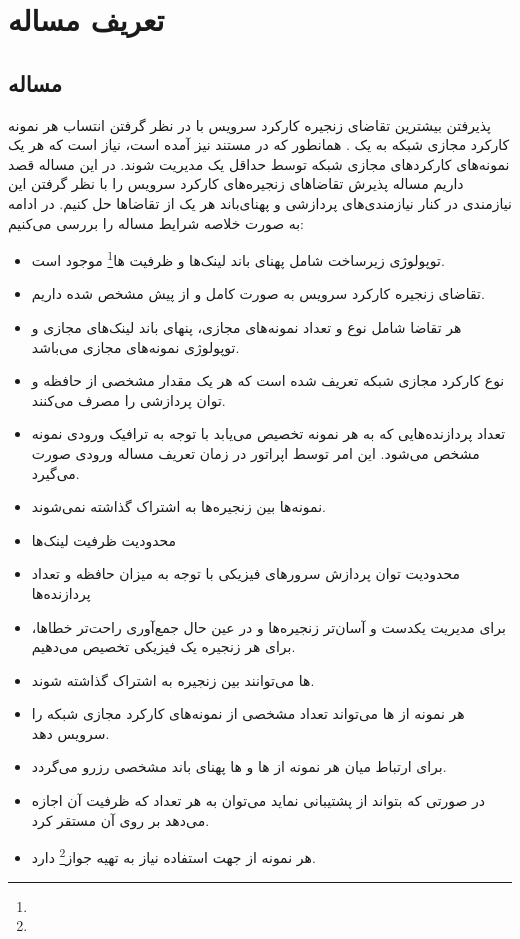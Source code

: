 \chapter{تعریف مساله}

\section{مساله}
پذیرفتن بیشترین تقاضای زنجیره‌ کارکرد سرویس با در نظر گرفتن انتساب هر نمونه کارکرد مجازی شبکه به یک .
همانطور که در مستند \cite{ETSI-MAN} نیز آمده است، نیاز است که هر یک نمونه‌های کارکردهای مجازی شبکه
توسط حداقل یک  مدیریت شوند.
در این مساله قصد داریم مساله پذیرش تقاضاهای زنجیره‌های کارکرد سرویس را با نظر گرفتن این نیازمندی در کنار
نیازمندی‌های پردازشی و پهنای‌باند هر یک از تقاضاها حل کنیم.
در ادامه به صورت خلاصه شرایط مساله را بررسی می‌کنیم:

\begin{itemize}
    \item توپولوژی زیرساخت شامل پهنای باند لینک‌ها و ظرفیت ها\footnote{} موجود است.
    \item {} تقاضای زنجیره‌ کارکرد سرویس به صورت کامل و از پیش مشخص شده داریم.
    \item هر تقاضا شامل نوع و تعداد نمونه‌های مجازی، پنهای باند لینک‌های مجازی و توپولوژی نمونه‌های مجازی می‌باشد.
    \item {} نوع کارکرد مجازی شبکه تعریف شده است که هر یک مقدار مشخصی از حافظه و توان پردازشی را مصرف می‌کنند.
    \item تعداد پردازنده‌هایی که به هر نمونه تخصیص می‌یابد با توجه به ترافیک ورودی نمونه مشخص می‌شود. این امر توسط اپراتور در زمان تعریف مساله ورودی صورت می‌گیرد.
    \item نمونه‌ها بین زنجیره‌ها به اشتراک گذاشته نمی‌شوند.
    \item محدودیت ظرفیت لینک‌ها
    \item محدودیت توان پردازش سرورهای فیزیکی با توجه به میزان حافظه و تعداد پردازنده‌ها
    \item برای مدیریت یکدست و آسان‌تر زنجیره‌ها و در عین حال جمع‌آوری راحت‌تر خطاها، برای هر زنجیره یک  فیزیکی تخصیص می‌دهیم.
    \item {}ها می‌توانند بین زنجیره به اشتراک گذاشته شوند.
    \item هر نمونه از ها می‌تواند تعداد مشخصی از نمونه‌های کارکرد مجازی شبکه را سرویس دهد. 
    \item برای ارتباط میان هر نمونه از ها و ها پهنای باند مشخصی رزرو می‌گردد.
    \item در صورتی که  بتواند از  پشتیبانی نماید می‌توان به هر تعداد که ظرفیت آن اجازه می‌دهد بر روی آن  مستقر کرد.
    \item هر نمونه از  جهت استفاده نیاز به تهیه جواز\footnote{} دارد.
\end{itemize}

